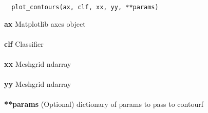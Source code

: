\begin{lstlisting}
  plot_contours(ax, clf, xx, yy, **params)
\end{lstlisting}

\noindent\textbf{ax}
Matplotlib axes object \\ \\
\textbf{clf}
Classifier \\ \\
\textbf{xx}
Meshgrid ndarray \\ \\
\textbf{yy}
Meshgrid ndarray \\ \\
\textbf{**params}
(Optional) dictionary of params to pass to contourf \\ \\
